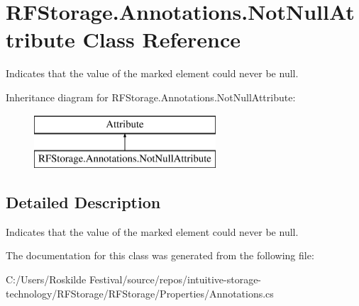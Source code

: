 \hypertarget{class_r_f_storage_1_1_annotations_1_1_not_null_attribute}{}\section{R\+F\+Storage.\+Annotations.\+Not\+Null\+Attribute Class Reference}
\label{class_r_f_storage_1_1_annotations_1_1_not_null_attribute}


Indicates that the value of the marked element could never be {\ttfamily null}.  


Inheritance diagram for R\+F\+Storage.\+Annotations.\+Not\+Null\+Attribute\+:\begin{figure}[H]
\begin{center}
\leavevmode
\includegraphics[height=2.000000cm]{class_r_f_storage_1_1_annotations_1_1_not_null_attribute}
\end{center}
\end{figure}


\subsection{Detailed Description}
Indicates that the value of the marked element could never be {\ttfamily null}. 


\begin{DoxyCode}{0}
\DoxyCodeLine{  \textcolor{keywordflow}{return} \textcolor{keyword}{null}; \textcolor{comment}{// Warning: Possible 'null' assignment}}
\DoxyCodeLine{\}}
\end{DoxyCode}


The documentation for this class was generated from the following file\+:\begin{DoxyCompactItemize}
\item 
C\+:/\+Users/\+Roskilde Festival/source/repos/intuitive-\/storage-\/technology/\+R\+F\+Storage/\+R\+F\+Storage/\+Properties/Annotations.\+cs\end{DoxyCompactItemize}
